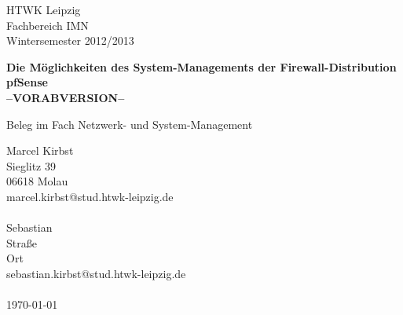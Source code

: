 \documentclass[a4paper,12pt]{scrartcl}
\begin{document}

\begin{titlepage}
\thispagestyle{htwkheader}		
HTWK Leipzig\\
Fachbereich IMN \\
Wintersemester 2012/2013




\begin{center}
\begin{Large}
\vfill {\textsf{\textbf{
Die Möglichkeiten des System-Managements der Firewall-Distribution
pfSense\\--VORABVERSION--\\
}}}
\end{Large}
Beleg im Fach Netzwerk- und System-Management
\end{center}

\begin{small}
\vfill
Marcel Kirbst \\
Sieglitz 39 \\
06618 Molau \\
marcel.kirbst@stud.htwk-leipzig.de\\
\\
Sebastian \\
Stra\ss{}e \\
Ort \\
sebastian.kirbst@stud.htwk-leipzig.de\\
\\
\today
\end{small}

\end{titlepage}
\addtolength{\voffset}{0cm}
\end{document}
